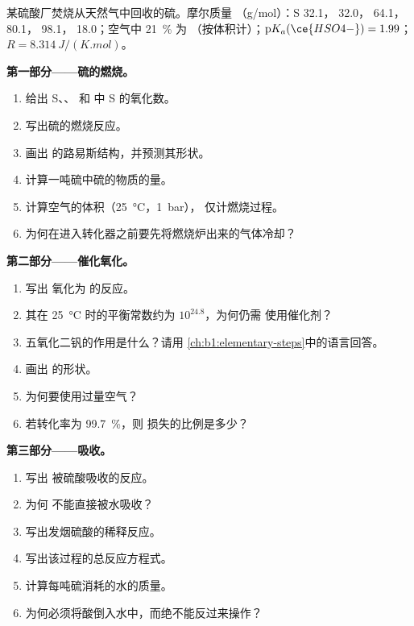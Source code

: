 \begin{problem}
\label{pb:b1:p-block-16-18:1}
某硫酸厂焚烧从天然气中回收的硫。摩尔质量
（\unit{g/mol}）：S 32.1， 32.0， 64.1， 80.1，
 98.1， 18.0；空气中 \qty{21}{\percent} 为
（按体积计）；$\mathrm{p}K_a(\ce{HSO4-}) = 1.99$；$R =
\qty{8.314}{J/(K.mol)}$。

\medskip
\noindent\textbf{第一部分——硫的燃烧。}
\begin{enumerate}
  \item 给出 S、、 和
         中 S 的氧化数。
  \item 写出硫的燃烧反应。
  \item 画出  的路易斯结构，并预测其形状。
  \item 计算一吨硫中硫的物质的量。
  \item 计算空气的体积（\qty{25}{\celsius}，\qty{1}{bar}），
        仅计燃烧过程。
  \item 为何在进入转化器之前要先将燃烧炉出来的气体冷却？
\end{enumerate}

\medskip
\noindent\textbf{第二部分——催化氧化。}
\begin{enumerate}[resume]
  \item 写出  氧化为  的反应。
  \item 其在 \qty{25}{\celsius} 时的平衡常数约为 $10^{24.8}$，为何仍需
        使用催化剂？
  \item 五氧化二钒的作用是什么？请用
        \cref{ch:b1:elementary-steps}中的语言回答。
  \item 画出  的形状。
  \item 为何要使用过量空气？
  \item 若转化率为
        \qty{99.7}{\percent}，则  损失的比例是多少？
\end{enumerate}

\medskip
\noindent\textbf{第三部分——吸收。}
\begin{enumerate}[resume]
  \item 写出  被硫酸吸收的反应。
  \item 为何  不能直接被水吸收？
  \item 写出发烟硫酸的稀释反应。
  \item 写出该过程的总反应方程式。
  \item 计算每吨硫消耗的水的质量。
  \item 为何必须将酸倒入水中，而绝不能反过来操作？
\end{enumerate}


\end{problem}
